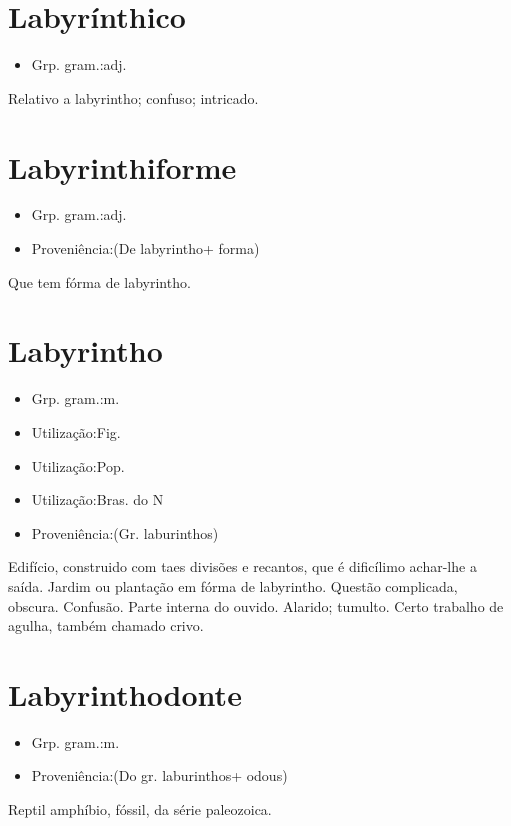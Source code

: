 \section{Labyrínthico}
\begin{itemize}
\item {Grp. gram.:adj.}
\end{itemize}
Relativo a labyrintho; confuso; intricado.
\section{Labyrinthiforme}
\begin{itemize}
\item {Grp. gram.:adj.}
\end{itemize}
\begin{itemize}
\item {Proveniência:(De \textunderscore labyrintho\textunderscore  + \textunderscore forma\textunderscore )}
\end{itemize}
Que tem fórma de labyrintho.
\section{Labyrintho}
\begin{itemize}
\item {Grp. gram.:m.}
\end{itemize}
\begin{itemize}
\item {Utilização:Fig.}
\end{itemize}
\begin{itemize}
\item {Utilização:Pop.}
\end{itemize}
\begin{itemize}
\item {Utilização:Bras. do N}
\end{itemize}
\begin{itemize}
\item {Proveniência:(Gr. \textunderscore laburinthos\textunderscore )}
\end{itemize}
Edifício, construido com taes divisões e recantos, que é dificílimo achar-lhe a saída.
Jardim ou plantação em fórma de labyrintho.
Questão complicada, obscura.
Confusão.
Parte interna do ouvido.
Alarido; tumulto.
Certo trabalho de agulha, também chamado \textunderscore crivo\textunderscore .
\section{Labyrinthodonte}
\begin{itemize}
\item {Grp. gram.:m.}
\end{itemize}
\begin{itemize}
\item {Proveniência:(Do gr. \textunderscore laburinthos\textunderscore  + \textunderscore odous\textunderscore )}
\end{itemize}
Reptil amphíbio, fóssil, da série paleozoica.
